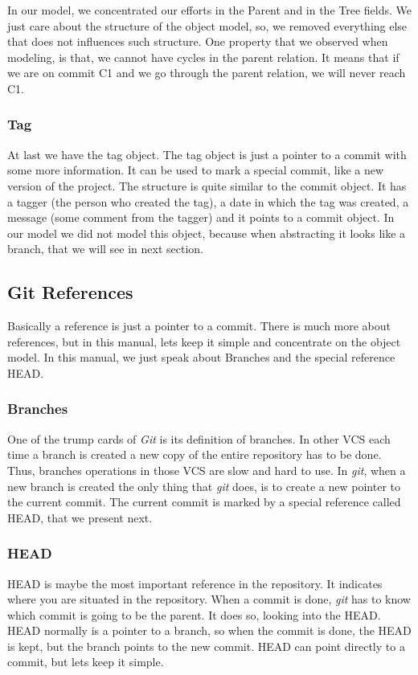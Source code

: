 In our model, we concentrated our efforts in the Parent and in the
Tree fields. We just care about the structure of the object model, so,
we removed everything else that does not influences such
structure. One property that we observed when modeling, is that, we
cannot have cycles in the parent relation. It means that if we are
on commit C1 and we go through the parent relation, we will never
reach C1.

\subsubsection{Tag}
At last we have the tag object. The tag object is just a pointer to
a commit with some more information. It can be used to mark a special 
commit, like a new version of the project. The structure is quite 
similar to the commit object. It has a tagger (the person who created 
the tag), a date in which the tag was created, a message (some
comment from the tagger) and it points to a commit object. In our
model we did not model this object, because when abstracting it looks
like a branch, that we will see in next section.

\subsection{Git References}
Basically a reference is just a pointer to a commit. There is much
more about references, but in this manual, lets keep it simple and
concentrate on the object model. In this manual, we just speak about
Branches and the special reference HEAD.

\subsubsection{Branches}
One of the trump cards of \emph{Git} is its definition of branches. In other
VCS each time a branch is created a new copy of the entire repository
has to be done. Thus, branches operations in those VCS are slow and hard to use. 
In \emph{git}, when a new branch is created the only thing that
\emph{git} does, is to create a new pointer to the current
commit. The current commit is marked by a special reference called
HEAD, that we present next.

\subsubsection{HEAD}
HEAD is maybe the most important reference in the repository. It
indicates where you are situated in the repository. When a commit is
done, \emph{git} has to know which commit is going to be the parent. 
It does so, looking into the HEAD. HEAD normally is a
pointer to a branch, so when the commit is done, the HEAD is kept, but
the branch points to the new commit. HEAD can point directly to a
commit, but lets keep it simple.

